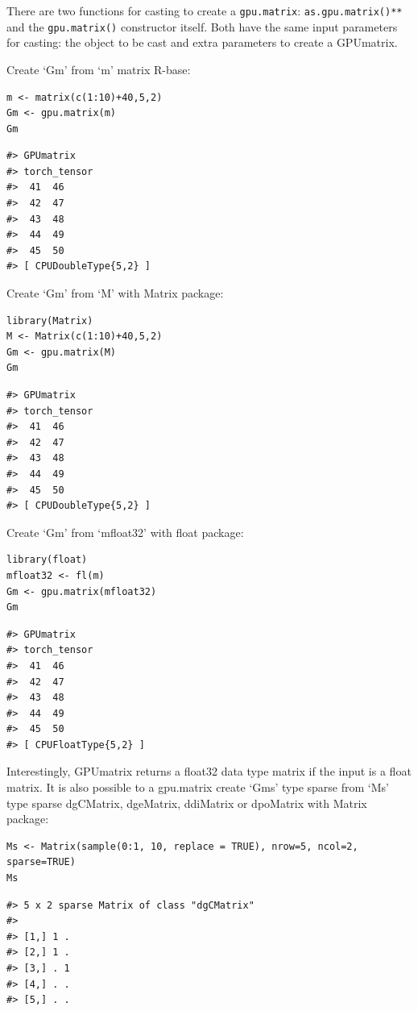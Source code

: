 There are two functions for casting to create a \texttt{gpu.matrix}: \texttt{as.gpu.matrix()**} and the \texttt{gpu.matrix()} constructor itself. Both have the same input parameters for casting: the object to be cast and extra parameters to create a GPUmatrix.

Create `Gm' from `m' matrix R-base:

\begin{verbatim}
m <- matrix(c(1:10)+40,5,2)
Gm <- gpu.matrix(m)
Gm
\end{verbatim}

\begin{verbatim}
#> GPUmatrix
#> torch_tensor
#>  41  46
#>  42  47
#>  43  48
#>  44  49
#>  45  50
#> [ CPUDoubleType{5,2} ]
\end{verbatim}

Create `Gm' from `M' with Matrix package:

\begin{verbatim}
library(Matrix)
M <- Matrix(c(1:10)+40,5,2)
Gm <- gpu.matrix(M)
Gm
\end{verbatim}

\begin{verbatim}
#> GPUmatrix
#> torch_tensor
#>  41  46
#>  42  47
#>  43  48
#>  44  49
#>  45  50
#> [ CPUDoubleType{5,2} ]
\end{verbatim}

Create `Gm' from `mfloat32' with float package:

\begin{verbatim}
library(float)
mfloat32 <- fl(m)
Gm <- gpu.matrix(mfloat32)
Gm
\end{verbatim}

\begin{verbatim}
#> GPUmatrix
#> torch_tensor
#>  41  46
#>  42  47
#>  43  48
#>  44  49
#>  45  50
#> [ CPUFloatType{5,2} ]
\end{verbatim}

Interestingly, GPUmatrix returns a float32 data type matrix if the input is a float matrix. It is also possible to a gpu.matrix create `Gms' type sparse from `Ms' type sparse dgCMatrix, dgeMatrix, ddiMatrix or dpoMatrix with Matrix package:

\begin{verbatim}
Ms <- Matrix(sample(0:1, 10, replace = TRUE), nrow=5, ncol=2, sparse=TRUE)
Ms
\end{verbatim}

\begin{verbatim}
#> 5 x 2 sparse Matrix of class "dgCMatrix"
#>         
#> [1,] 1 .
#> [2,] 1 .
#> [3,] . 1
#> [4,] . .
#> [5,] . .
\end{verbatim}

